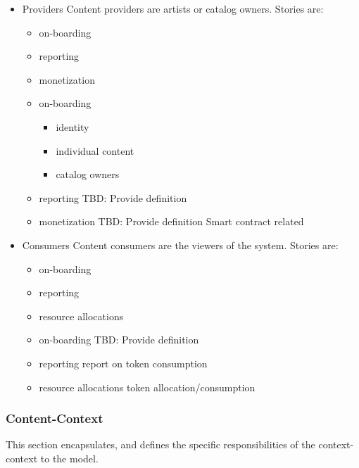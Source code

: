 \documentclass[11pt]{article}
\begin{document}
\begin{itemize}
\item Providers
\label{sec:org0f2aca8}
Content providers are artists or catalog owners. Stories are:
\begin{itemize}
\item on-boarding
\item reporting
\item monetization
\end{itemize}

\begin{itemize}
\item on-boarding
\label{sec:org567c974}
\begin{itemize}
\item identity
\item individual content
\item catalog owners
\end{itemize}

\item reporting
\label{sec:org280f01d}
TBD: Provide definition 

\item monetization
\label{sec:org2d589b4}
TBD: Provide definition 
Smart contract related
\end{itemize}

\item Consumers
\label{sec:org2fd4db9}
Content consumers are the viewers of the system.  Stories are:
\begin{itemize}
\item on-boarding
\item reporting
\item resource allocations
\end{itemize}

\begin{itemize}
\item on-boarding
\label{sec:org1858654}
TBD: Provide definition 

\item reporting
\label{sec:orgc6e9514}
report on token consumption

\item resource allocations
\label{sec:orgcfee835}
token allocation/consumption
\end{itemize}
\end{itemize}

\subsubsection*{Content-Context}
\label{sec:org97fc8c0}
This section encapsulates, and defines the specific responsibilities of the context-context to the model.
\end{document}
